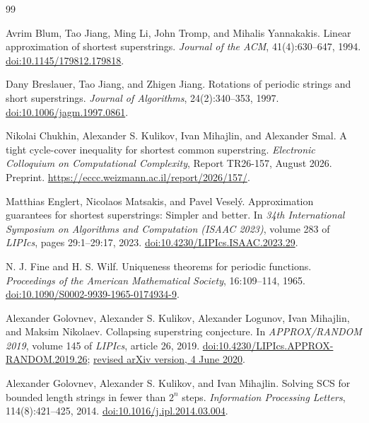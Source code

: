 \begingroup\small
\begin{thebibliography}{99}

Avrim Blum, Tao Jiang, Ming Li, John Tromp, and Mihalis Yannakakis.
\newblock Linear approximation of shortest superstrings.
\newblock \emph{Journal of the ACM}, 41(4):630--647, 1994.
\newblock \href{https://doi.org/10.1145/179812.179818}{doi:10.1145/179812.179818}.

Dany Breslauer, Tao Jiang, and Zhigen Jiang.
\newblock Rotations of periodic strings and short superstrings.
\newblock \emph{Journal of Algorithms}, 24(2):340--353, 1997.
\newblock \href{https://doi.org/10.1006/jagm.1997.0861}{doi:10.1006/jagm.1997.0861}.

Nikolai Chukhin, Alexander S. Kulikov, Ivan Mihajlin, and Alexander Smal.
\newblock A tight cycle-cover inequality for shortest common superstring.
\newblock \emph{Electronic Colloquium on Computational Complexity},
Report TR26-157, August 2026. Preprint.
\newblock \url{https://eccc.weizmann.ac.il/report/2026/157/}.

Matthias Englert, Nicolaos Matsakis, and Pavel Vesel\'{y}.
\newblock Approximation guarantees for shortest superstrings: Simpler and better.
\newblock In \emph{34th International Symposium on Algorithms and
Computation (ISAAC 2023)}, volume 283 of \emph{LIPIcs}, pages 29:1--29:17, 2023.
\newblock \href{https://doi.org/10.4230/LIPIcs.ISAAC.2023.29}{doi:10.4230/LIPIcs.ISAAC.2023.29}.

N. J. Fine and H. S. Wilf.
\newblock Uniqueness theorems for periodic functions.
\newblock \emph{Proceedings of the American Mathematical Society}, 16:109--114, 1965.
\newblock \href{https://doi.org/10.1090/S0002-9939-1965-0174934-9}{doi:10.1090/S0002-9939-1965-0174934-9}.

Alexander Golovnev, Alexander S. Kulikov, Alexander Logunov,
Ivan Mihajlin, and Maksim Nikolaev.
\newblock Collapsing superstring conjecture.
\newblock In \emph{APPROX/RANDOM 2019}, volume 145 of \emph{LIPIcs},
article 26, 2019.
\newblock \href{https://doi.org/10.4230/LIPIcs.APPROX-RANDOM.2019.26}{doi:10.4230/LIPIcs.APPROX-RANDOM.2019.26};
\href{https://arxiv.org/abs/1809.08669v3}{revised arXiv version, 4 June 2020}.

Alexander Golovnev, Alexander S. Kulikov, and Ivan Mihajlin.
\newblock Solving {SCS} for bounded length strings in fewer than $2^n$ steps.
\newblock \emph{Information Processing Letters}, 114(8):421--425, 2014.
\newblock \href{https://doi.org/10.1016/j.ipl.2014.03.004}{doi:10.1016/j.ipl.2014.03.004}.


\end{thebibliography}
